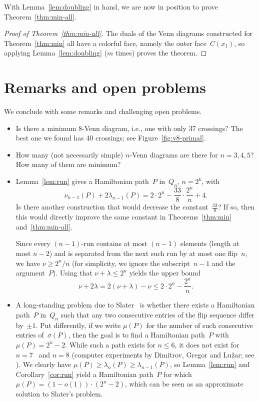 \documentclass[a4paper,11pt,reqno]{amsart}
\begin{document}
With Lemma~\ref{lem:doubling} in hand, we are now in position to prove Theorem~\ref{thm:min-all}.

\begin{proof}[Proof of Theorem~\ref{thm:min-all}]
The duals of the Venn diagrams constructed for Theorem~\ref{thm:min} all have a colorful face, namely the outer face~$C(x_1)$, so applying Lemma~\ref{lem:doubling} ($m$ times) proves the theorem.
\end{proof}


\section{Remarks and open problems}
\label{sec:open}

We conclude with some remarks and challenging open problems.

\begin{itemize}[leftmargin=4mm]
\item
Is there a minimum 8-Venn diagram, i.e., one with only 37 crossings?
The best one we found has 40 crossings; see Figure~\ref{fig:v8-primal}.

\item
How many (not necessarily simple) $n$-Venn diagrams are there for $n=3,4,5$?
How many of them are minimum?

\item
Lemma~\ref{lem:run} gives a Hamiltonian path~$P$ in~$Q_n$, $n=2^k$, with
\[ \nu_{n-1}(P)+2\lambda_{n-1}(P)=2\cdot 2^n-\frac{33}{8}\cdot\frac{2^n}{n}+4. \]
Is there another construction that would decrease the constant~$\frac{33}{8}$?
If so, then this would directly improve the same constant in Theorems~\ref{thm:min} and~\ref{thm:min-all}.

Since every $(n-1)$-run contains at most $(n-1)$ elements (length at most $n-2$) and is separated from the next such run by at most one flip~$n$, we have $\nu\geq 2^n/n$ (for simplicity, we ignore the subscript~$n-1$ and the argument~$P$).
Using that $\nu+\lambda\le 2^n$ yields the upper bound
\[ \nu+2\lambda=2(\nu+\lambda)-\nu \le 2\cdot 2^n-\frac{2^n}{n}. \]

\item
A long-standing problem due to Slater~\cite{slater_1979} is whether there exists a Hamiltonian path~$P$ in~$Q_n$ such that any two consecutive entries of the flip sequence differ by~$\pm 1$.
Put differently, if we write $\mu(P)$ for the number of such consecutive entries of~$\sigma(P)$, then the goal is to find a Hamiltonian path~$P$ with $\mu(P)=2^n-2$.
While such a path exists for $n\le 6$, it does not exist for $n=7$~\cite{slater_1989} and $n=8$ (computer experiments by Dimitrov, Gregor and Lu\v{z}ar; see \cite[Problem~10]{MR4649606}).
We clearly have $\mu(P)\geq\lambda_n(P)\geq \lambda_{n-1}(P)$, so Lemma~\ref{lem:run} and Corollary~\ref{cor:run} yield a Hamiltonian path~$P$ for which $\mu(P)=(1-o(1))\cdot (2^n-2)$, which can be seen as an approximate solution to Slater's problem.
\end{itemize}



\end{document}

